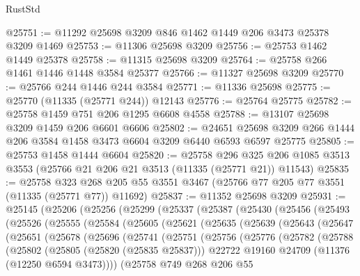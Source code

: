 \begin{lexlean}{RustStd}
\begin{coremodule}
{\begin{coremodule}
{{{{{{{{{{{{{{{{{{{{{{{{{{{{{{{{{{{{{{{{{{{{{{{{{{{{{{{{{{{{{{{{{{{{{{{{{{{{{{{{{{{{{@25751 := @11292 @25698 @3209 @846 @1462 @1449 @206 @3473 @25378 @3209 @1469
@25753 := @11306 @25698 @3209
@25756 := @25753 @1462 @1449 @25378
@25758 := @11315 @25698 @3209
@25764 := @25758 @266 @1461 @1446 @1448 @3584 @25377
@25766 := @11327 @25698 @3209
@25770 := @25766 @244 @1446 @244 @3584
@25771 := @11336 @25698
@25775 := @25770 (@11335 (@25771 @244)) @12143
@25776 := @25764 @25775
@25782 := @25758 @1459 @751 @206 @1295 @6608 @4558
@25788 := @13107 @25698 @3209 @1459 @206 @6601 @6606
@25802 := @24651 @25698 @3209 @266 @1444 @206 @3584 @1458 @3473 @6604 @3209 @6440 @6593 @6597 @25775
@25805 := @25753 @1458 @1444 @6604
@25820 := @25758
    @296
    @325
    @206
    @1085
    @3513
    @3553
    (@25766 @21 @206 @21 @3513 (@11335 (@25771 @21)) @11543)
@25835 := @25758
    @323
    @268
    @205
    @55
    @3551
    @3467
    (@25766 @77 @205 @77 @3551 (@11335 (@25771 @77)) @11692)
@25837 := @11352 @25698 @3209
@25931 := @25145
    (@25206
      (@25256
        (@25299
          (@25337
            (@25387
              (@25430
                (@25456
                  (@25493
                    (@25526
                      (@25555
                        (@25584
                          (@25605
                            (@25621
                              (@25635
                                (@25639
                                  (@25643
                                    (@25647
                                      (@25651
                                        (@25678
                                          (@25696
                                            (@25741
                                              (@25751
                                                (@25756
                                                  (@25776
                                                    (@25782
                                                      (@25788
                                                        (@25802
                                                          (@25805 (@25820 (@25835 @25837)))
                                                          @22722
                                                          @19160
                                                          @24709
                                                          (@11376 (@12250 @6594 @3473))))
                                                      (@25758
                                                        @749
                                                        @268
                                                        @206
                                                        @55
}}}}}}}}}}}}}}}}}}}}}}}}}}}}}}}}}}}}}}}}}}}}}}}}}}}}}}}}}}}}}}}}}}}}}}}}}}}}}}}}}}}}}
\end{coremodule}}
\end{coremodule}
\end{lexlean}
